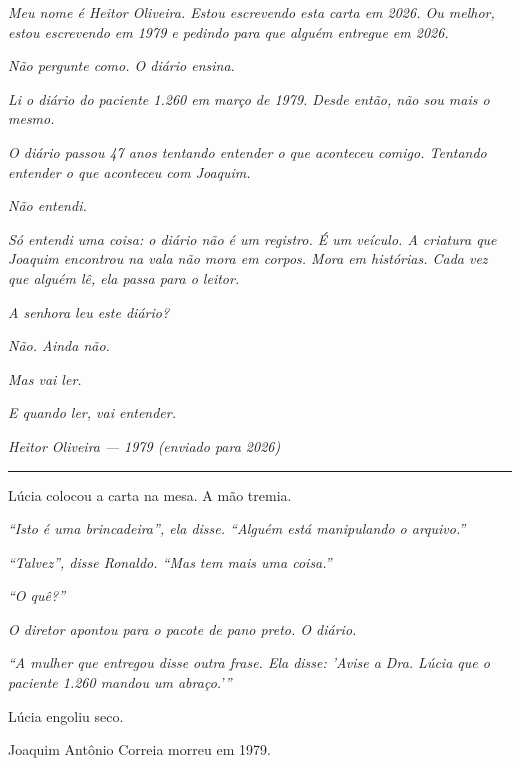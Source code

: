 \noindent \textit{Meu nome é Heitor Oliveira. Estou escrevendo esta carta em 2026. Ou melhor, estou escrevendo em 1979 e pedindo para que alguém entregue em 2026.}

\noindent \textit{Não pergunte como. O diário ensina.}

\noindent \textit{Li o diário do paciente 1.260 em março de 1979. Desde então, não sou mais o mesmo.}

\noindent \textit{O diário passou 47 anos tentando entender o que aconteceu comigo. Tentando entender o que aconteceu com Joaquim.}

\noindent \textit{Não entendi.}

\noindent \textit{Só entendi uma coisa: o diário não é um registro. É um veículo. A criatura que Joaquim encontrou na vala não mora em corpos. Mora em histórias. Cada vez que alguém lê, ela passa para o leitor.}

\noindent \textit{A senhora leu este diário?}

\noindent \textit{Não. Ainda não.}

\noindent \textit{Mas vai ler.}

\noindent \textit{E quando ler, vai entender.}

\noindent \textit{Heitor Oliveira}
\textit{--- 1979 (enviado para 2026)}

\vspace{0.5em}\noindent\rule{\textwidth}{0.5pt}\vspace{0.5em}

\noindent Lúcia colocou a carta na mesa. A mão tremia.

\noindent \textit{\textquotedblleft{}Isto é uma brincadeira\textquotedblright{}\textit{, ela disse. }\textquotedblleft{}Alguém está manipulando o arquivo.\textquotedblright{}}

\noindent \textit{\textquotedblleft{}Talvez\textquotedblright{}\textit{, disse Ronaldo. }\textquotedblleft{}Mas tem mais uma coisa.\textquotedblright{}}

\noindent \textit{\textquotedblleft{}O quê?\textquotedblright{}}

\noindent \textit{O diretor apontou para o pacote de pano preto. O diário.}

\noindent \textit{\textquotedblleft{}A mulher que entregou disse outra frase. Ela disse: 'Avise a Dra. Lúcia que o paciente 1.260 mandou um abraço.'\textquotedblright{}}

\noindent Lúcia engoliu seco.

\noindent Joaquim Antônio Correia morreu em 1979.

